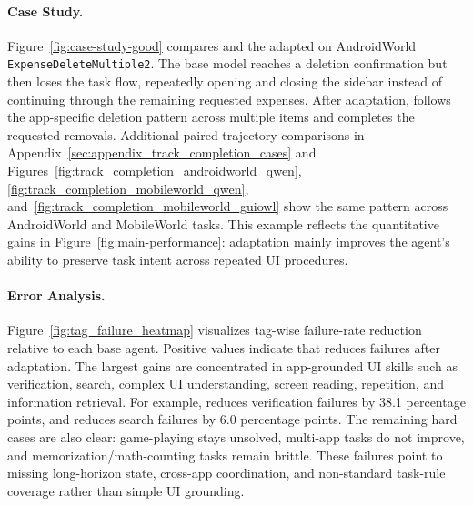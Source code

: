 \paragraph{Case Study.}
Figure~\ref{fig:case-study-good} compares  and the adapted  on AndroidWorld \texttt{ExpenseDeleteMultiple2}. The base model reaches a deletion confirmation but then loses the task flow, repeatedly opening and closing the sidebar instead of continuing through the remaining requested expenses. After \ourmethod adaptation,  follows the app-specific deletion pattern across multiple items and completes the requested removals. Additional paired trajectory comparisons in Appendix~\ref{sec:appendix_track_completion_cases} and Figures~\ref{fig:track_completion_androidworld_qwen}, \ref{fig:track_completion_mobileworld_qwen}, and~\ref{fig:track_completion_mobileworld_guiowl} show the same pattern across AndroidWorld and MobileWorld tasks. This example reflects the quantitative gains in Figure~\ref{fig:main-performance}: adaptation mainly improves the agent's ability to preserve task intent across repeated UI procedures.



\paragraph{Error Analysis.}
Figure~\ref{fig:tag_failure_heatmap} visualizes tag-wise failure-rate reduction relative to each base agent. Positive values indicate that \ourmethod reduces failures after adaptation. The largest gains are concentrated in app-grounded UI skills such as verification, search, complex UI understanding, screen reading, repetition, and information retrieval. For example,  reduces verification failures by 38.1 percentage points, and  reduces search failures by 6.0 percentage points. The remaining hard cases are also clear: game-playing stays unsolved, multi-app tasks do not improve, and memorization/math-counting tasks remain brittle. These failures point to missing long-horizon state, cross-app coordination, and non-standard task-rule coverage rather than simple UI grounding.
